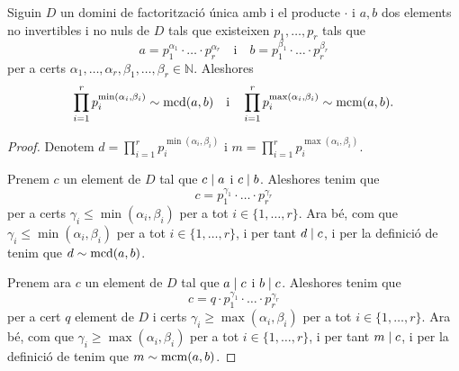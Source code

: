 \documentclass[../Apunts.tex]{subfiles}
\begin{document}
	\begin{proposition}
		Siguin \(D\) un domini de factorització única amb i el producte \(\cdot\) i \(a,b\) dos elements no invertibles i no nuls de \(D\) tals que existeixen \(p_{1},\dots,p_{r}\) tals que
		\[a=p_{1}^{\alpha_{1}}\cdot\ldots\cdot p_{r}^{\alpha_{r}}\quad\text{i}\quad b=p_{1}^{\beta_{1}}\cdot\ldots\cdot p_{r}^{\beta_{r}}\]
		per a certs \(\alpha_{1},\dots,\alpha_{r},\beta_{1},\dots,\beta_{r}\in\mathbb{N}\). Aleshores
		\[\prod_{i=1}^{r}p_{i}^{\min(\alpha_{i},\beta_{i})}\sim\operatorname{mcd}(a,b)\quad\text{i}\quad\prod_{i=1}^{r}p_{i}^{\max(\alpha_{i},\beta_{i})}\sim\operatorname{mcm}(a,b).\]
		\begin{proof}
			Denotem \(d=\prod_{i=1}^{r}p_{i}^{\min(\alpha_{i},\beta_{i})}\) i \(m=\prod_{i=1}^{r}p_{i}^{\max(\alpha_{i},\beta_{i})}\).
			
			Prenem \(c\) un element de \(D\) tal que \(c\mathrel{|} a\) i \(c\mathrel{|} b\). Aleshores tenim que
			\[c=p_{1}^{\gamma_{1}}\cdot\ldots\cdot p_{r}^{\gamma_{r}}\]
			per a certs \(\gamma_{i}\leq\min(\alpha_{i},\beta_{i})\) per a tot \(i\in\{1,\dots,r\}\). Ara bé, com que \(\gamma_{i}\leq\min(\alpha_{i},\beta_{i})\) per a tot \(i\in\{1,\dots,r\}\), i per tant \(d\mathrel{|} c\), i per la definició de  tenim que \(d\sim\operatorname{mcd}(a,b)\).
			
			Prenem ara \(c\) un element de \(D\) tal que \(a\mathrel{|} c\) i \(b\mathrel{|} c\). Aleshores tenim que
			\[c=q\cdot p_{1}^{\gamma_{1}}\cdot\ldots\cdot p_{r}^{\gamma_{r}}\]
			per a cert \(q\) element de \(D\) i certs \(\gamma_{i}\geq\max(\alpha_{i},\beta_{i})\) per a tot \(i\in\{1,\dots,r\}\). Ara bé, com que \(\gamma_{i}\geq\max(\alpha_{i},\beta_{i})\) per a tot \(i\in\{1,\dots,r\}\), i per tant \(m\mathrel{|} c\), i per la definició de  tenim que \(m\sim\operatorname{mcm}(a,b)\).
		\end{proof}
	\end{proposition}
\end{document}
